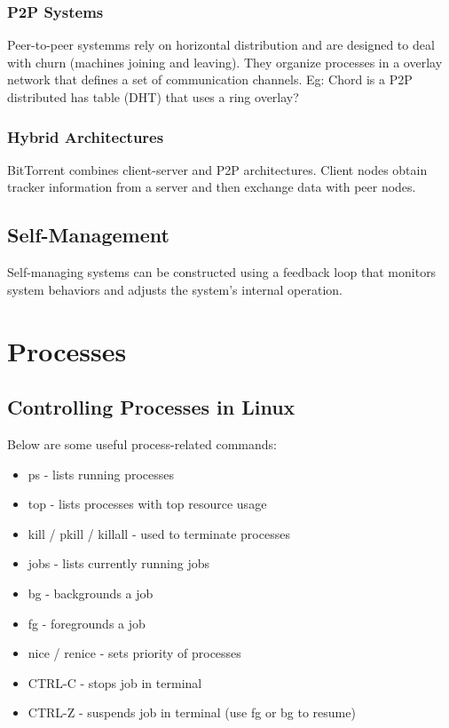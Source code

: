\documentclass[12pt,titlepage]{article}
\let\stdsection\section
\renewcommand\section{\clearpage\stdsection}
\begin{document}
      \subsubsection{P2P Systems}
      Peer-to-peer systemms rely on horizontal distribution and are designed to deal with churn (machines joining and leaving). They organize processes in a overlay network that defines a set of communication channels. Eg: Chord is a P2P distributed has table (DHT) that uses a ring overlay? 
      
      \subsubsection{Hybrid Architectures}
      BitTorrent combines client-server and P2P architectures. Client nodes obtain tracker information from a server and then exchange data with peer nodes.

    \subsection{Self-Management}
      Self-managing systems can be constructed using a feedback loop that monitors system behaviors and adjusts the system's internal operation.

  \section{Processes}
    \subsection{Controlling Processes in Linux}
      Below are some useful process-related commands:
      \begin{itemize}
        \item ps - lists running processes
        \item top - lists processes with top resource usage
        \item kill / pkill / killall - used to terminate processes
        \item jobs - lists currently running jobs
        \item bg - backgrounds a job
        \item fg - foregrounds a job
        \item nice / renice - sets priority of processes
        \item CTRL-C - stops job in terminal
        \item CTRL-Z - suspends job in terminal (use fg or bg to resume)
      \end{itemize}
\end{document}
